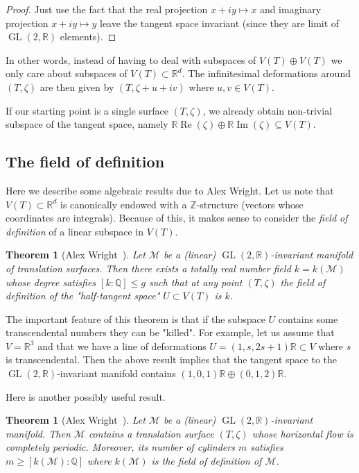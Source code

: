 \documentclass[a4paper,12pt]{article}
\def\bR{\mathbb{R}}
\def\bQ{\mathbb{Q}}
\def\bZ{\mathbb{Z}}
\def\cM{\mathcal{M}}
\def\Re{\operatorname{Re}}
\def\Im{\operatorname{Im}}
\def\GL{\operatorname{GL}}
\newtheorem{theorem}[definition]{Theorem}
\begin{document}
\begin{proof}
Just use the fact that the real projection $x+iy \mapsto x$ and imaginary projection
$x+iy \mapsto y$ leave the tangent space invariant (since they are limit of $\GL(2,\bR)$
elements).
\end{proof}

In other words, instead of having to deal with subspaces of $V(T) \oplus V(T)$ we only
care about subspaces of $V(T) \subset \bR^d$. The infinitesimal deformations around $(T,\zeta)$ are
then given by $(T, \zeta + u + i v)$ where $u, v \in V(T)$.

If our starting point is a single surface $(T, \zeta)$, we already obtain
non-trivial subspace of the tangent space, namely $\bR \Re(\zeta) \oplus \bR
\Im(\zeta) \subseteq V(T)$.

\subsection{The field of definition}
Here we describe some algebraic results due to Alex Wright. Let us note that
$V(T) \subset \bR^d$ is canonically endowed with a $\bZ$-structure (vectors
whose coordinates are integrals). Because of this, it makes sense to consider
the \textit{field of definition} of a linear subspace in $V(T)$.
\begin{theorem}[Alex Wright~\cite{Wright-field-of-def}]
Let $\cM$ be a (linear) $\GL(2,\bR)$-invariant manifold of translation surfaces.
Then there exists a totally real number field $k = k(\cM)$ whose degree satisfies
$[k : \bQ] \leq g$ such that at any point $(T,\zeta)$ the field of definition
of the "half-tangent space" $U \subset V(T)$ is $k$.
\end{theorem}
The important feature of this theorem is that if the subspace $U$ contains
some transcendental numbers they can be "killed". For example, let us assume
that $V = \bR^3$ and that we have a line of deformations $U = (1, s, 2s+1) \bR \subset V$
where $s$ is transcendental. Then the above result implies that the tangent
space to the $\GL(2,\bR)$-invariant manifold contains $(1, 0, 1) \bR \oplus (0,
1, 2) \bR$.

Here is another possibly useful result.
\begin{theorem}[Alex Wright~\cite{Wright-field-of-def}]
Let $\cM$ be a (linear) $\GL(2,\bR)$-invariant manifold. Then $\cM$ contains a
translation surface $(T,\zeta)$ whose horizontal flow is completely periodic.
Moreover, its number of cylinders $m$ satisfies $m \geq [k(\cM) : \bQ]$ where $k(\cM)$
is the field of definition of $\cM$.
\end{theorem}
\end{document}
